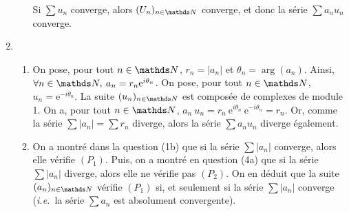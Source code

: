 \documentclass[a4paper]{article}
\begin{document}
\begin{enumerate}
\begin{enumerate}
					Si $\sum u_n$\/ converge, alors $(U_n)_{n\in\N}$\/ converge, et donc la série $\sum a_n u_n$\/ converge.
			\end{enumerate}
		\item
			\begin{enumerate}
				\item On pose, pour tout $n \in \N$, $r_n = |a_n|$\/ et $\theta_n = \arg(a_n)$. Ainsi, $\forall n \in \N,\: a_n = r_n \mathrm{e}^{i \theta_n}$. On pose, pour tout $n \in \N$, $u_n = \mathrm{e}^{-i\theta_n}$. La suite $(u_n)_{n\in\N}$\/ est composée de complexes de module 1. On a, pour tout $n \in \N$, $a_n\:u_n = r_n\:\mathrm{e}^{i\theta_n}\: \mathrm{e}^{-i\theta_n} = r_n$. Or, comme la série $\sum|a_n| = \sum r_n$\/ diverge, alors la série $\sum a_n u_n$\/ diverge également.
				\item On a montré dans la question (1b) que si la série $\sum |a_n|$\/ converge, alors elle vérifie $(P_1)$. Puis, on a montré en question (4a) que si la série $\sum |a_n|$\/ diverge, alors elle ne vérifie pas $(P_2)$. On en déduit que la suite $(a_n)_{n\in\N}$\/ vérifie $(P_1)$\/ si, et seulement si la série $\sum |a_n|$\/ converge (\textit{i.e.}\ la série $\sum a_n$\/ est absolument convergente).
			\end{enumerate}
	\end{enumerate}
\end{document}
